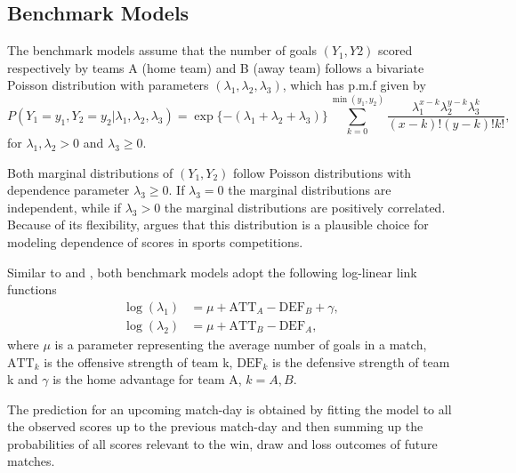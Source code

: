 \documentclass[journal,article,accept,moreauthors,pdftex,12pt,a4paper]{mdpi}
\begin{document}
    \subsection{Benchmark Models}
    \label{sec::Benchmark}

    The benchmark models assume that the number of goals $(Y_1, Y2)$ scored respectively by teams A (home team) and B (away
    team) follows a bivariate Poisson distribution \citep{Holgate64} with parameters $(\lambda_1, \lambda_2, \lambda_3)$,
    which has p.m.f given by
\begin{equation*}
P(Y_1 = y_1, Y_2 = y_2 | \lambda_1, \lambda_2, \lambda_3) =
\exp\{-(\lambda_1 + \lambda_2 + \lambda_3)\}
 \sum_{k = 0}^{\min(y_1, y_2)} \dfrac{\lambda_1^{x - k} \lambda_2^{y - k} \lambda_3^k}{(x-k)!(y -
 k)!k!}, \label{eq::pois.biv}
\end{equation*}
for $\lambda_1, \lambda_2 > 0$ and $\lambda_3 \geq 0$.

Both marginal distributions of $(Y_1, Y_2)$ follow Poisson
distributions with dependence parameter $\lambda_3 \geq 0$. If
$\lambda_3 = 0$ the marginal distributions are independent, while if
$\lambda_3 > 0$ the marginal distributions are positively
correlated. Because of its flexibility, \cite{Karlis2003} argues
that this distribution is a plausible choice for modeling dependence
of scores in sports competitions.


Similar to \cite{Lee97} and \cite{Karlis2003}, both benchmark models
adopt the following log-linear link functions
\begin{align*}
\log(\lambda_1) &= \mu + \text{ATT}_A - \text{DEF}_B + \gamma, \\
\log(\lambda_2) &= \mu + \text{ATT}_B - \text{DEF}_A,
\end{align*}
where $\mu$ is a parameter representing the average number of goals
in a match, $\text{ATT}_k$ is the offensive strength of team k,
$\text{DEF}_k$ is the defensive strength of team k and $\gamma$ is
the home advantage for team A, $k = A, B$.

The prediction for an upcoming match-day is obtained by fitting the
model to all the observed scores up to the previous match-day and
then summing up the probabilities of all scores relevant to the win,
draw and loss outcomes of future matches.
\end{document}
